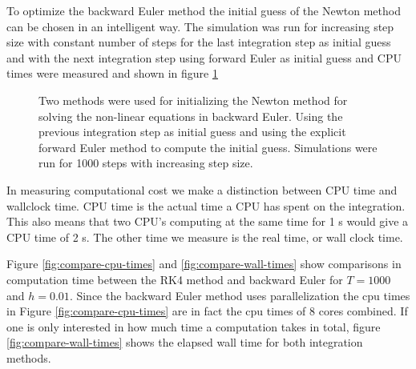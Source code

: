 \documentclass{article}
\begin{document}
To optimize the backward Euler method the initial guess of the Newton method can be chosen in an intelligent way. The simulation was run for increasing step size with constant number of steps for the last integration step as initial guess and with the next integration step using forward Euler as initial guess and CPU times were measured and shown in figure \ref{fig:newtInit}

\begin{figure}
\caption{Two methods were used for initializing the Newton method for solving the non-linear equations in backward Euler. Using the previous integration step as initial guess and using the explicit forward Euler method to compute the initial guess. Simulations were run for 1000 steps with increasing step size.}
\label{fig:newtInit}
\end{figure}

In measuring computational cost we make a distinction between CPU time and wallclock time. CPU time is the actual time a CPU has spent on the integration. This also means that two CPU's computing at the same time for 1 s would give a CPU time of 2 s. The other time we measure is the real time, or wall clock time.

Figure \ref{fig:compare-cpu-times} and \ref{fig:compare-wall-times} show comparisons in computation time between the RK4 method and backward Euler for $T=1000$ and $h=0.01$. Since the backward Euler method uses parallelization the cpu times in Figure \ref{fig:compare-cpu-times} are in fact the cpu times of 8 cores combined. If one is only interested in how much time a computation takes in total, figure \ref{fig:compare-wall-times} shows the elapsed wall time for both integration methods.
\end{document}
